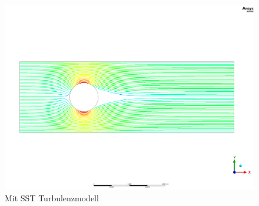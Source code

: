 \begin{refsection}
\begin{figure}
    \includegraphics[width=\textwidth]{papers/reynolds/images/sst.png}
    \caption{Mit SST Turbulenzmodell}
    \label{fig:SST}
\end{figure}







\printbibliography[heading=subbibliography]
\end{refsection}
